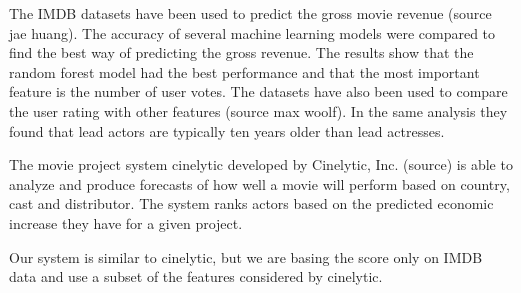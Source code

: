 The IMDB datasets have been used to predict the gross movie revenue (source jae huang). The accuracy of several machine learning models
were compared to find the best way of predicting the gross revenue. The results show that the random forest model had the best performance
and that the most important feature is the number of user votes. The datasets have also been used to compare the user rating with other
features (source max woolf). In the same analysis they found that lead actors are typically ten years older than lead actresses.

The movie project system cinelytic developed by Cinelytic, Inc. (source) is able to analyze and produce forecasts of how well a movie
will perform based on country, cast and distributor. The system ranks actors based on the predicted economic increase they have for
a given project. 

Our system is similar to cinelytic, but we are basing the score only on IMDB data and use a subset of the features considered by cinelytic.